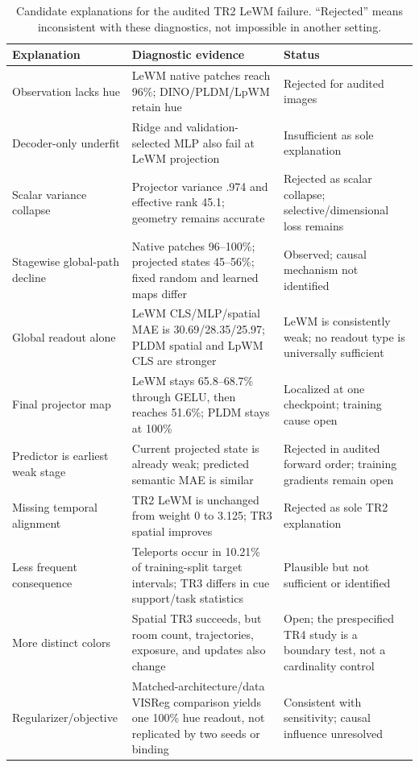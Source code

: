 \documentclass{article}
\begin{document}
\begin{table}[t]
\centering
\small
\setlength{\tabcolsep}{4pt}
\begin{tabular}{@{}p{}p{}p{}@{}}
\toprule
Explanation & Diagnostic evidence & Status \\
\midrule
Observation lacks hue & LeWM native patches reach 96\%; DINO/PLDM/LpWM retain hue & Rejected for audited images \\
Decoder-only underfit & Ridge and validation-selected MLP also fail at LeWM projection & Insufficient as sole explanation \\
Scalar variance collapse & Projector variance .974 and effective rank 45.1; geometry remains accurate & Rejected as scalar collapse; selective/dimensional loss remains \\
Stagewise global-path decline & Native patches 96--100\%; projected states 45--56\%; fixed random and learned maps differ & Observed; causal mechanism not identified \\
Global readout alone & LeWM CLS/MLP/spatial MAE is 30.69/28.35/25.97; PLDM spatial and LpWM CLS are stronger & LeWM is consistently weak; no readout type is universally sufficient \\
Final projector map & LeWM stays 65.8--68.7\% through GELU, then reaches 51.6\%; PLDM stays at 100\% & Localized at one checkpoint; training cause open \\
Predictor is earliest weak stage & Current projected state is already weak; predicted semantic MAE is similar & Rejected in audited forward order; training gradients remain open \\
Missing temporal alignment & TR2 LeWM is unchanged from weight 0 to 3.125; TR3 spatial improves & Rejected as sole TR2 explanation \\
Less frequent consequence & Teleports occur in 10.21\% of training-split target intervals; TR3 differs in cue support/task statistics & Plausible but not sufficient or identified \\
More distinct colors & Spatial TR3 succeeds, but room count, trajectories, exposure, and updates also change & Open; the prespecified TR4 study is a boundary test, not a cardinality control \\
Regularizer/objective & Matched-architecture/data VISReg comparison yields one 100\% hue readout, not replicated by two seeds or binding & Consistent with sensitivity; causal influence unresolved \\
\bottomrule
\end{tabular}
\caption{Candidate explanations for the audited TR2 LeWM failure.  ``Rejected''
means inconsistent with these diagnostics, not impossible in another setting.}
\label{tab:explanations}
\end{table}
\end{document}
